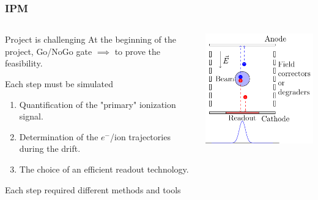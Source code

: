 \begin{frame}[t]
  \frametitle{IPM}
  \begin{columns}
    \begin{column}{0.45\textwidth}
      \begin{alertblock}{Project is challenging}
        At the beginning of the project, Go/NoGo gate $\implies$ to prove the feasibility.
      \end{alertblock}
      \begin{block}{Each step must be simulated}
        \begin{enumerate}
          \item Quantification of the "primary" ionization signal.
          \item Determination of the $e^-$/ion trajectories during the drift.
          \item The choice of an efficient readout technology.
        \end{enumerate}
      \end{block}
      Each step required different methods and tools
    \end{column}
    \begin{column}{0.45\textwidth}
      \includegraphics[width=\textwidth]{02_ESS/fig/fig000_IPM.pdf}
    \end{column}
  \end{columns}
\end{frame}

